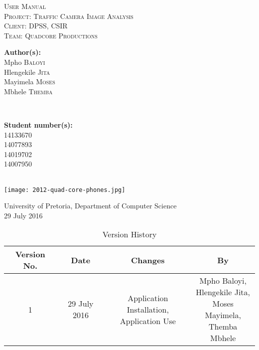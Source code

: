 \documentclass[a4paper,12pt]{article}
\begin{document}
\begin{titlepage}
\center

\textsc{\LARGE User Manual}\\[1.5cm]
\textsc{\Large Project: Traffic Camera Image Analysis}\\[1.5cm]
\textsc{\large Client: DPSS, CSIR}\\[0.5cm]
\textsc{\large Team: Quadcore Productions}\\[0.5cm]

\begin{minipage}{0.4\textwidth}
\begin{flushleft} \large
\textbf{Author(s):}\\
Mpho \textsc{Baloyi}\\
Hlengekile \textsc{Jita}\\
Mayimela \textsc{Moses}\\
Mbhele \textsc{Themba}\\
\end{flushleft}
\end{minipage}
~
\begin{minipage}{0.4\textwidth}
\begin{flushright} \large
\textbf{Student number(s):} \\
14133670\\ %
14077893\\
14019702\\
14007950\\
\end{flushright}
\end{minipage}\\

\texttt{[image: 2012-quad-core-phones.jpg]}

{\large University of Pretoria, Department of Computer Science}\\

{\large 29 July 2016}\\[3cm]

\vfil

\end{titlepage}

\newpage
\tableofcontents
\newpage

\newpage
\begin{table}[ht]
 \centering
 \caption{Version History}
 \label{tab:table1}
 \begin{tabular}{cccc}
   \toprule
    Version No. & Date & Changes & By\\
    \midrule
    1 & 29 July 2016 & \makecell{Application Installation, \\ Application Use} & \makecell{Mpho Baloyi,\\ Hlengekile Jita,\\ Moses Mayimela,\\ Themba Mbhele} \\
    \bottomrule
  \end{tabular}
\end{table}
\newpage
\end{document}
